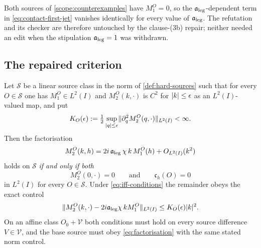 \begin{scope}
\label{scope:counterexamples-blind}
Both sources of \cref{scope:counterexamples} have $M_1^O=0$, so the
$\mathfrak{a}_{\mathrm{leg}}$-dependent term in \cref{eq:contact-first-jet} vanishes identically for
every value of $\mathfrak{a}_{\mathrm{leg}}$. The refutation and its checker are therefore
untouched by the clause-(3b) repair; neither needed an edit when the
stipulation $\mathfrak{a}_{\mathrm{leg}}=1$ was withdrawn.
\end{scope}


\subsection{The repaired criterion}

\begin{theorem}
\label{thm:ml5-a}
\statusProved

Let $\mathcal S$ be a linear source class in the norm of
\cref{def:hard-sources} such that for every $O\in\mathcal S$ one has
$M_1^O\in L^2(I)$ and $M_2^O(k,\cdot)$ is $C^2$ for $\lvert k\rvert\le\epsilon$ as an
$L^2(I)$-valued map, and put
\begin{equation}
  K_O(\epsilon):=\tfrac12\sup_{\lvert q\rvert\le\epsilon}
  \lVert \partial_q^2M_2^O(q,\cdot)\rVert_{L^2(I)}<\infty.
  \label{eq:KO}
\end{equation}
Then the factorisation
\begin{equation}
  M_2^O(k,h)=2i\,\mathfrak{a}_{\mathrm{leg}}\,\chi\,k\,M_1^O(h)+O_{L^2(I)}(k^2)
  \label{eq:factorisation}
\end{equation}
holds on $\mathcal S$ \emph{if and only if both}
\begin{equation}
  M_2^O(0,\cdot)=0
  \qquad\text{and}\qquad
  \mathfrak c_h(O)=0
  \label{eq:iff-conditions}
\end{equation}
in $L^2(I)$ for every $O\in\mathcal S$. Under \cref{eq:iff-conditions} the
remainder obeys the exact control
\begin{equation}
  \lVert M_2^O(k,\cdot)-2i\mathfrak{a}_{\mathrm{leg}}\chi\,kM_1^O\rVert_{L^2(I)}\le K_O(\epsilon)\lvert k\rvert^2 .
  \label{eq:taylor-control}
\end{equation}
On an affine class $O_0+\mathcal V$ both conditions must hold on every source
difference $V\in\mathcal V$, and the base source must obey
\cref{eq:factorisation} with the same stated norm control.
\end{theorem}

